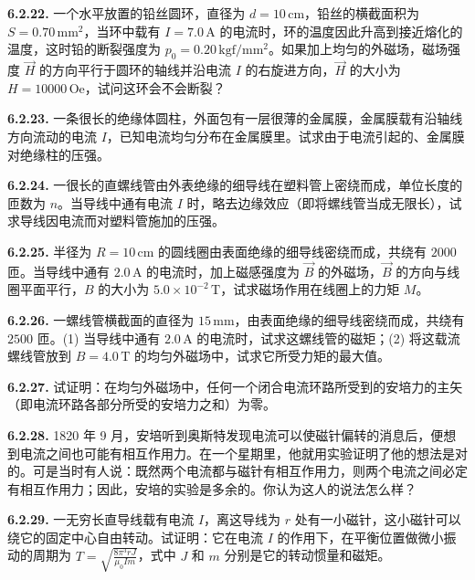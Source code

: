 \vfill
\newpage

\textbf{6.2.22.} 一个水平放置的铅丝圆环，直径为 $d = 10\,\mathrm{cm}$，铅丝的横截面积为 $S = 0.70\,\mathrm{mm}^{2}$，当环中载有 $I = 7.0\,\mathrm{A}$ 的电流时，环的温度因此升高到接近熔化的温度，这时铅的断裂强度为 $p_{0} = 0.20\,\mathrm{kgf/mm^{2}}$。如果加上均匀的外磁场，磁场强度 $\vec{H}$ 的方向平行于圆环的轴线并沿电流 $I$ 的右旋进方向，$\vec{H}$ 的大小为 $H = 10000\,\mathrm{Oe}$，试问这环会不会断裂？

\vfill
\newpage

\textbf{6.2.23.} 一条很长的绝缘体圆柱，外面包有一层很薄的金属膜，金属膜载有沿轴线方向流动的电流 $I$，已知电流均匀分布在金属膜里。试求由于电流引起的、金属膜对绝缘柱的压强。

\vfill
\newpage

\textbf{6.2.24.} 一很长的直螺线管由外表绝缘的细导线在塑料管上密绕而成，单位长度的匝数为 $n$。当导线中通有电流 $I$ 时，略去边缘效应（即将螺线管当成无限长），试求导线因电流而对塑料管施加的压强。

\vfill
\newpage

\textbf{6.2.25.} 半径为 $R = 10\,\mathrm{cm}$ 的圆线圈由表面绝缘的细导线密绕而成，共绕有 $2000$ 匝。当导线中通有 $2.0\,\mathrm{A}$ 的电流时，加上磁感强度为 $\vec{B}$ 的外磁场，$\vec{B}$ 的方向与线圈平面平行，$B$ 的大小为 $5.0 \times 10^{-2}\,\mathrm{T}$，试求磁场作用在线圈上的力矩 $M$。

\vfill
\newpage

\textbf{6.2.26.} 一螺线管横截面的直径为 $15\,\mathrm{mm}$，由表面绝缘的细导线密绕而成，共绕有 $2500$ 匝。(1) 当导线中通有 $2.0\,\mathrm{A}$ 的电流时，试求这螺线管的磁矩；(2) 将这载流螺线管放到 $B = 4.0\,\mathrm{T}$ 的均匀外磁场中，试求它所受力矩的最大值。

\vfill
\newpage

\textbf{6.2.27.} 试证明：在均匀外磁场中，任何一个闭合电流环路所受到的安培力的主矢（即电流环路各部分所受的安培力之和）为零。

\vfill
\newpage

\textbf{6.2.28.} 1820 年 9 月，安培听到奥斯特发现电流可以使磁针偏转的消息后，便想到电流之间也可能有相互作用力。在一个星期里，他就用实验证明了他的想法是对的。可是当时有人说：既然两个电流都与磁针有相互作用力，则两个电流之间必定有相互作用力；因此，安培的实验是多余的。你认为这人的说法怎么样？

\vfill
\newpage

\textbf{6.2.29.} 一无穷长直导线载有电流 $I$，离这导线为 $r$ 处有一小磁针，这小磁针可以绕它的固定中心自由转动。试证明：它在电流 $I$ 的作用下，在平衡位置做微小振动的周期为 $\displaystyle T = \sqrt{\frac{8\pi^{3} r J}{\mu_{0} I m}}$，式中 $J$ 和 $m$ 分别是它的转动惯量和磁矩。

